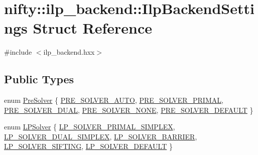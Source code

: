 \hypertarget{structnifty_1_1ilp__backend_1_1IlpBackendSettings}{}\section{nifty\+:\+:ilp\+\_\+backend\+:\+:Ilp\+Backend\+Settings Struct Reference}
\label{structnifty_1_1ilp__backend_1_1IlpBackendSettings}


{\ttfamily \#include $<$ilp\+\_\+backend.\+hxx$>$}

\subsection*{Public Types}
\begin{DoxyCompactItemize}
\item 
enum \hyperlink{structnifty_1_1ilp__backend_1_1IlpBackendSettings_ad16c71cc049dcb37c07f2abdda69dab4}{Pre\+Solver} \{ \newline
\hyperlink{structnifty_1_1ilp__backend_1_1IlpBackendSettings_ad16c71cc049dcb37c07f2abdda69dab4a2d2186dcdaa22ae42023acbc03922c48}{P\+R\+E\+\_\+\+S\+O\+L\+V\+E\+R\+\_\+\+A\+U\+TO}, 
\hyperlink{structnifty_1_1ilp__backend_1_1IlpBackendSettings_ad16c71cc049dcb37c07f2abdda69dab4a0b937d225c3ee4733bff63397c614b78}{P\+R\+E\+\_\+\+S\+O\+L\+V\+E\+R\+\_\+\+P\+R\+I\+M\+AL}, 
\hyperlink{structnifty_1_1ilp__backend_1_1IlpBackendSettings_ad16c71cc049dcb37c07f2abdda69dab4a53cbe16a2893471008b7f3c00c5c040f}{P\+R\+E\+\_\+\+S\+O\+L\+V\+E\+R\+\_\+\+D\+U\+AL}, 
\hyperlink{structnifty_1_1ilp__backend_1_1IlpBackendSettings_ad16c71cc049dcb37c07f2abdda69dab4ad0065467805a6fba8d8d9e7293e4bfc2}{P\+R\+E\+\_\+\+S\+O\+L\+V\+E\+R\+\_\+\+N\+O\+NE}, 
\newline
\hyperlink{structnifty_1_1ilp__backend_1_1IlpBackendSettings_ad16c71cc049dcb37c07f2abdda69dab4a45adcc6c0d30422e0c0a674b2fe92a37}{P\+R\+E\+\_\+\+S\+O\+L\+V\+E\+R\+\_\+\+D\+E\+F\+A\+U\+LT}
 \}
\item 
enum \hyperlink{structnifty_1_1ilp__backend_1_1IlpBackendSettings_a4b3fd0d313a8d95f9f6a3ba64802e204}{L\+P\+Solver} \{ \newline
\hyperlink{structnifty_1_1ilp__backend_1_1IlpBackendSettings_a4b3fd0d313a8d95f9f6a3ba64802e204a02afc6e85659e3fda7c48df74d3e3934}{L\+P\+\_\+\+S\+O\+L\+V\+E\+R\+\_\+\+P\+R\+I\+M\+A\+L\+\_\+\+S\+I\+M\+P\+L\+EX}, 
\hyperlink{structnifty_1_1ilp__backend_1_1IlpBackendSettings_a4b3fd0d313a8d95f9f6a3ba64802e204aadd4ba29f78f9104467f136c05d6e354}{L\+P\+\_\+\+S\+O\+L\+V\+E\+R\+\_\+\+D\+U\+A\+L\+\_\+\+S\+I\+M\+P\+L\+EX}, 
\hyperlink{structnifty_1_1ilp__backend_1_1IlpBackendSettings_a4b3fd0d313a8d95f9f6a3ba64802e204afbfc81377d73d1c59b31be26a8bf8fb2}{L\+P\+\_\+\+S\+O\+L\+V\+E\+R\+\_\+\+B\+A\+R\+R\+I\+ER}, 
\hyperlink{structnifty_1_1ilp__backend_1_1IlpBackendSettings_a4b3fd0d313a8d95f9f6a3ba64802e204ac6de1eff7352159f0db89583e569f86e}{L\+P\+\_\+\+S\+O\+L\+V\+E\+R\+\_\+\+S\+I\+F\+T\+I\+NG}, 
\newline
\hyperlink{structnifty_1_1ilp__backend_1_1IlpBackendSettings_a4b3fd0d313a8d95f9f6a3ba64802e204a24fa810f69bf55c40d68082a2e3653f8}{L\+P\+\_\+\+S\+O\+L\+V\+E\+R\+\_\+\+D\+E\+F\+A\+U\+LT}
 \}
\end{DoxyCompactItemize}
